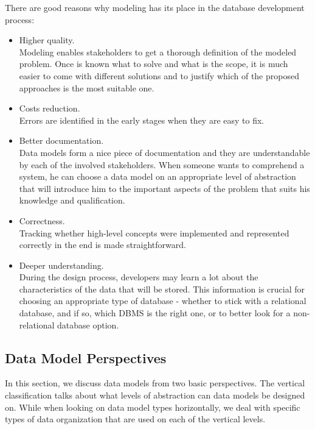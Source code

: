 There are good reasons why modeling has its place in the database development process:

\begin{itemize}
	\item Higher quality.\\ Modeling enables stakeholders to get a thorough definition of the modeled problem. Once is known what to solve and what is the scope, it is much easier to come with different solutions and to justify which of the proposed approaches is the most suitable one.
	
	\item Costs reduction.\\ Errors are identified in the early stages when they are easy to fix.
	
	\item Better documentation.\\ Data models form a nice piece of documentation and they are understandable by each of the involved stakeholders. When someone wants to comprehend a system, he can choose a data model on an appropriate level of abstraction that will introduce him to the important aspects of the problem that suits his knowledge and qualification.
	
	\item Correctness.\\ Tracking whether high-level concepts were implemented and represented correctly in the end is made straightforward.
	
	\item Deeper understanding.\\ During the design process, developers may learn a lot about the characteristics of the data that will be stored. This information is crucial for choosing an appropriate type of database - whether to stick with a relational database, and if so, which DBMS is the right one, or to better look for a non-relational database option.
\end{itemize}

\subsection{Data Model Perspectives}

In this section, we discuss data models from two basic perspectives. 
The vertical classification talks about what levels of abstraction can data models be designed on.
While when looking on data model types horizontally, we deal with specific types of data organization that are used on each of the vertical levels.

